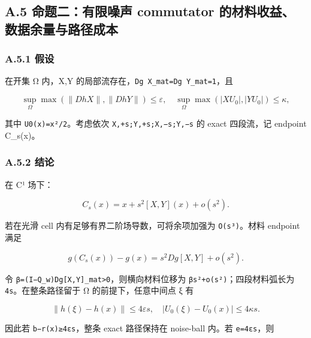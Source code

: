 \documentclass[
  11pt,
  a4paper,
]{article}
\begin{document}
\hypertarget{a.5-ux547dux9898ux4e8cux6709ux9650ux566aux58f0-commutator-ux7684ux6750ux6599ux6536ux76caux6570ux636eux4f59ux91cfux4e0eux8defux5f84ux6210ux672c}{%
\subsection{A.5 命题二：有限噪声 commutator
的材料收益、数据余量与路径成本}\label{a.5-ux547dux9898ux4e8cux6709ux9650ux566aux58f0-commutator-ux7684ux6750ux6599ux6536ux76caux6570ux636eux4f59ux91cfux4e0eux8defux5f84ux6210ux672c}}

\hypertarget{a.5.1-ux5047ux8bbe}{%
\subsubsection{A.5.1 假设}\label{a.5.1-ux5047ux8bbe}}

在开集 Ω 内，X,Y
的局部流存在，\texttt{\textbar{}\textbar{}Dg\ X\textbar{}\textbar{}\_\allowbreak{}mat=\textbar{}\textbar{}Dg\ Y\textbar{}\textbar{}\_\allowbreak{}mat=1}，且

\[
\sup_\Omega\max(\|DhX\|,\|DhY\|)\le\varepsilon,
\quad
\sup_\Omega\max(|XU_0|,|YU_0|)\le\kappa,
\]

其中
\texttt{U0(x)=\textbar{}\textbar{}x\textbar{}\textbar{}²/2}。考虑依次
\texttt{X,+s;Y,+s;X,−s;Y,−s} 的 exact 四段流，记 endpoint C\_\allowbreak{}s(x)。

\hypertarget{a.5.2-ux7ed3ux8bba}{%
\subsubsection{A.5.2 结论}\label{a.5.2-ux7ed3ux8bba}}

在 C¹ 场下：

\[
C_s(x)=x+s^2[X,Y](x)+o(s^2).
\]

若在光滑 cell 内有足够有界二阶场导数，可将余项加强为
\texttt{O(s³)}。材料 endpoint 满足

\[
g(C_s(x))-g(x)=s^2Dg[X,Y]+o(s^2).
\]

令
\texttt{β=\textbar{}\textbar{}(I−Q\_\allowbreak{}w)Dg{[}X,Y{]}\textbar{}\textbar{}\_\allowbreak{}mat\textgreater{}0}，则横向材料位移为
\texttt{βs²+o(s²)}；四段材料弧长为 \nolinkurl{4s}。在整条路径留于 Ω
的前提下，任意中间点 ξ 有

\[
\|h(\xi)-h(x)\|\le4\varepsilon s,\quad
|U_0(\xi)-U_0(x)|\le4\kappa s.
\]

因此若 \texttt{b−\textbar{}\textbar{}r(x)\textbar{}\textbar{}≥4εs}，整条
exact 路径保持在 noise-ball 内。若 \texttt{e=4εs}，则
\end{document}
